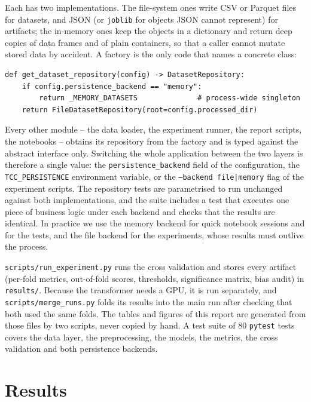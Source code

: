 \documentclass[11pt,a4paper]{article}
\begin{document}
Each has two implementations.  The file-system ones write CSV or Parquet files
for datasets, and JSON (or \texttt{joblib} for objects JSON cannot represent)
for artifacts; the in-memory ones keep the objects in a dictionary and return
deep copies of data frames and of plain containers, so that a caller cannot
mutate stored data by accident.  A factory is the
only code that names a concrete class:

\begin{lstlisting}
def get_dataset_repository(config) -> DatasetRepository:
    if config.persistence_backend == "memory":
        return _MEMORY_DATASETS              # process-wide singleton
    return FileDatasetRepository(root=config.processed_dir)
\end{lstlisting}

Every other module -- the data loader, the experiment runner, the report
scripts, the notebooks -- obtains its repository from the factory and is typed
against the abstract interface only.  Switching the whole application between
the two layers is therefore a single value: the \texttt{persistence\_backend}
field of the configuration, the \texttt{TCC\_PERSISTENCE} environment
variable, or the \texttt{--backend file|memory} flag of the experiment
scripts.  The repository tests are parametrised to run unchanged against both
implementations, and the suite includes a
test that executes one piece of business logic under each backend and checks
that the results are identical.  In practice we use the memory backend for
quick notebook sessions and for the tests, and the file backend for the
experiments, whose results must outlive the process.

\texttt{scripts/run\_experiment.py} runs the cross validation and stores every
artifact (per-fold metrics, out-of-fold scores, thresholds, significance
matrix, bias audit) in \texttt{results/}.  Because the transformer needs a
GPU, it is run separately, and \texttt{scripts/merge\_runs.py} folds its
results into the main run after checking that both used the same folds.  The
tables and figures of this report are generated from those files by two
scripts, never copied by hand.
A test suite of 80 \texttt{pytest} tests covers the data layer, the
preprocessing, the models, the metrics, the cross validation and both
persistence backends.

\section{Results}
\end{document}
